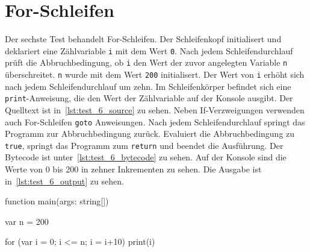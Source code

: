 \section{For-Schleifen}

Der sechste Test behandelt For-Schleifen. Der Schleifenkopf initialisert und deklariert eine Zählvariable \texttt{i} mit dem Wert \texttt{0}. Nach jedem Schleifendurchlauf prüft die Abbruchbedingung, ob \texttt{i} den Wert der zuvor angelegten Variable \texttt{n} überschreitet. \texttt{n} wurde mit dem Wert \texttt{200} initialisert. Der Wert von \texttt{i} erhöht sich nach jedem Schleifendurchlauf um zehn. Im Schleifenkörper befindet sich eine \texttt{print}-Anweisung, die den Wert der Zählvariable auf der Konsole ausgibt. Der Quelltext ist in~\autoref{lst:test_6_source} zu sehen. Neben If-Verzweigungen verwenden auch For-Schleifen \texttt{goto} Anweisungen. Nach jedem Schleifendurchlauf springt das Programm zur Abbruchbedingung zurück. Evaluiert die Abbruchbedingung zu \texttt{true}, springt das Programm zum \texttt{return} und beendet die Ausführung. Der Bytecode ist unter~\autoref{lst:test_6_bytecode} zu sehen. Auf der Konsole sind die Werte von 0 bis 200 in zehner Inkrementen zu sehen. Die Ausgabe ist in~\autoref{lst:test_6_output} zu sehen.

\begin{ToyaCode}[numbers=none, caption={For-Schleifen},label=lst:test_6_source]
function main(args: string[]) {
    var n = 200

    for (var i = 0; i <= n; i = i+10) {
        print(i)
    }
}
\end{ToyaCode}


